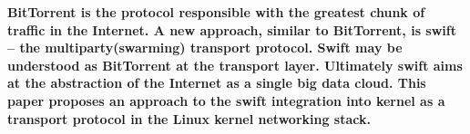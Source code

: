 {\bf
BitTorrent is the protocol responsible with the greatest chunk of traffic in the Internet. A new approach, similar to 
BitTorrent, is swift – the multiparty(swarming) transport protocol. Swift may be understood as BitTorrent at the
transport layer. Ultimately swift aims at the abstraction of the Internet as a single big data cloud. This paper
proposes an approach to the swift integration into kernel as a transport protocol in the Linux kernel networking
stack.}

